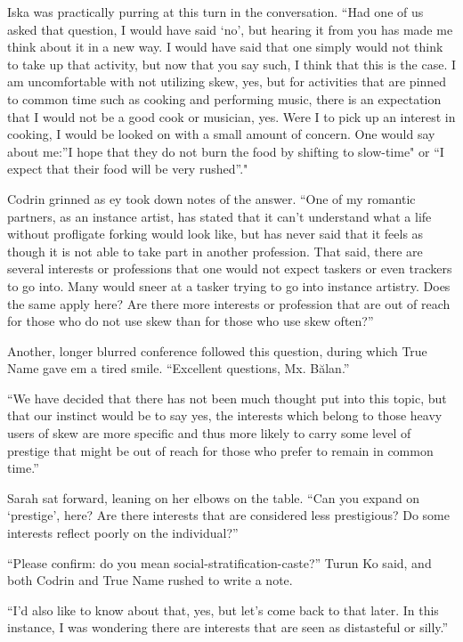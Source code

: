 Iska was practically purring at this turn in the conversation. ``Had one of us asked that question, I would have said `no', but hearing it from you has made me think about it in a new way. I would have said that one simply would not think to take up that activity, but now that you say such, I think that this is the case. I am uncomfortable with not utilizing skew, yes, but for activities that are pinned to common time such as cooking and performing music, there is an expectation that I would not be a good cook or musician, yes. Were I to pick up an interest in cooking, I would be looked on with a small amount of concern. One would say about me:''I hope that they do not burn the food by shifting to slow-time" or ``I expect that their food will be very rushed''."

Codrin grinned as ey took down notes of the answer. ``One of my romantic partners, as an instance artist, has stated that it can't understand what a life without profligate forking would look like, but has never said that it feels as though it is not able to take part in another profession. That said, there are several interests or professions that one would not expect taskers or even trackers to go into. Many would sneer at a tasker trying to go into instance artistry. Does the same apply here? Are there more interests or profession that are out of reach for those who do not use skew than for those who use skew often?''

Another, longer blurred conference followed this question, during which True Name gave em a tired smile. ``Excellent questions, Mx. Bălan.''

``We have decided that there has not been much thought put into this topic, but that our instinct would be to say yes, the interests which belong to those heavy users of skew are more specific and thus more likely to carry some level of prestige that might be out of reach for those who prefer to remain in common time.''

Sarah sat forward, leaning on her elbows on the table. ``Can you expand on `prestige', here? Are there interests that are considered less prestigious? Do some interests reflect poorly on the individual?''

``Please confirm: do you mean social-stratification-caste?'' Turun Ko said, and both Codrin and True Name rushed to write a note.

``I'd also like to know about that, yes, but let's come back to that later. In this instance, I was wondering there are interests that are seen as distasteful or silly.''

